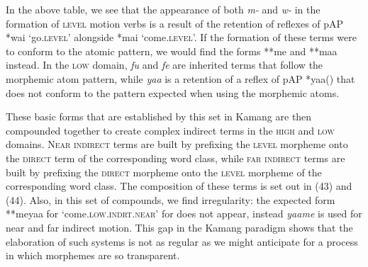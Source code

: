 In the above table, we see that the appearance of both \textit{m-} and \textit{w-} in the formation of \textsc{level} motion verbs is a result of the retention of reflexes of pAP *wai `go.\textsc{level'} alongside *mai `come.\textsc{level'.} If the formation of these terms were to conform to the atomic pattern, we would find the forms **me and **maa{\ng} instead. In the \textsc{low} domain, \textit{fu{\ng}} and \textit{fe} are inherited terms that follow the morphemic atom pattern, while \textit{yaa{\ng}} is a retention of a reflex of pAP *yaa({\ng}) that does not conform to the pattern expected when using the morphemic atoms.

These basic forms that are established by this set in Kamang are then compounded together to create complex indirect terms in the \textsc{high} and \textsc{low} domains. N\textsc{ear} \textsc{indirect} terms are built by prefixing the \textsc{level} morpheme onto the \textsc{direct} term of the corresponding word class, while \textsc{far} \textsc{indirect} terms are built by prefixing the \textsc{direct} morpheme onto the \textsc{level} morpheme of the corresponding word class. The composition of these terms is set out in (43) and (44). Also, in this set of compounds, we find irregularity: the expected form **meyaa{\ng} for `come.\textsc{low.indrt.near}' for does not appear, instead \textit{yaa{\ng}me} is used for near and far indirect motion. This gap in the Kamang paradigm shows that the elaboration of such systems is not as regular as we might anticipate for a process in which morphemes are so transparent.




